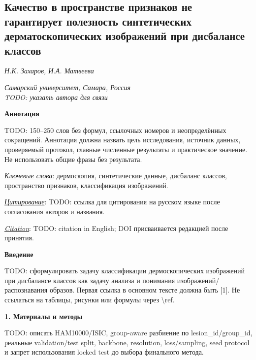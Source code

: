\documentclass[10pt,a4paper]{article}
\begin{document}
\begin{center}
    \section*{Качество в пространстве признаков не гарантирует полезность синтетических дерматоскопических изображений при дисбалансе классов}
\end{center}

\begin{center}
\it{Н.К. Захаров, И.А. Матвеева}

\it{Самарский университет, Самара, Россия}\\
TODO: указать автора для связи
\end{center}

\begin{center}
    {\bf Аннотация}
\end{center}

TODO: 150--250 слов без формул, ссылочных номеров и неопределённых сокращений. Аннотация должна назвать цель исследования, источник данных, проверяемый протокол, главные численные результаты и практическое значение. Не использовать общие фразы без результата.

\underline{\it{Ключевые слова}}: дермоскопия, синтетические данные, дисбаланс классов, пространство признаков, классификация изображений.

\underline{\it{Цитирование}}: TODO: ссылка для цитирования на русском языке после согласования авторов и названия.

\underline{\it{Citation}}: TODO: citation in English; DOI присваивается редакцией после принятия.

\begin{center}
    {\bf Введение}
\end{center}

TODO: сформулировать задачу классификации дермоскопических изображений при дисбалансе классов как задачу анализа и понимания изображений/распознавания образов. Первая ссылка в основном тексте должна быть [1]. Не ссылаться на таблицы, рисунки или формулы через \textbackslash ref.

\begin{center}
    {\bf 1. Материалы и методы}
\end{center}

TODO: описать HAM10000/ISIC, group-aware разбиение по lesion_id/group_id, реальные validation/test split, backbone, resolution, loss/sampling, seed protocol и запрет использования locked test до выбора финального метода.
\end{document}
